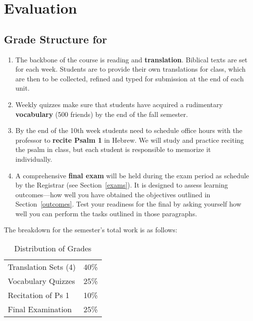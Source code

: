 \documentclass[titlepage]{article}
\begin{document}
\section{Evaluation}
\label{evaluation}

\subsection{Grade Structure for \ccode}
\label{structure}

\begin{enumerate}

 \item The backbone of the course is reading and \textbf{translation}.
 Biblical texts are set for each week. Students are to provide their own
 translations for class, which are then to be collected, refined and
 typed for submission at the end of each unit.

 \item Weekly quizzes make sure that students have acquired a
 rudimentary \textbf{vocabulary} (500 friends) by the end of the fall
 semester.

 \item By the end of the 10th week students need to schedule office
 hours with the professor to \textbf{recite Psalm 1} in Hebrew. We will
 study and practice reciting the psalm in class, but each student is
 responsible to memorize it individually.

 \item A comprehensive \textbf{final exam} will be held during the exam
 period as schedule by the Registrar (see Section~\ref{exams}). It is
 designed to assess learning outcomes---how well you have obtained the
 objectives outlined in Section~\ref{outcomes}. Test your readiness for
 the final by asking yourself how well you can perform the tasks
 outlined in those paragraphs.

\end{enumerate}

The breakdown for the semester's total work is as follows:

\begin{table}[htbp]
  \centering
  {\lining
  \begin{tabular}{lr}
    \toprule
    Translation Sets (4) & 40\% \\
    Vocabulary Quizzes   & 25\% \\
    Recitation of Ps 1  & 10\% \\
    Final Examination    & 25\% \\
    \bottomrule
  \end{tabular}}
  \caption{Distribution of Grades}
  \label{distribution}
\end{table}
\end{document}
